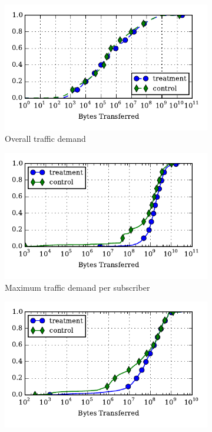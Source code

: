 \begin{figure}[ht]
\begin{minipage}{1\linewidth}
\centering
%
\begin{subfigure}[b]{0.33\linewidth}
\includegraphics[width=\linewidth]{figures/cdf-all-bytes.pdf}
               \caption{Overall traffic demand\label{fig:CDF-data-rate}}
\end{subfigure}
%
\begin{subfigure}[b]{0.33\linewidth}
\includegraphics[width=\linewidth]{figures/cdf-per-device-max.pdf}
               \caption{Maximum traffic demand 
per subscriber\label{fig:CDF-data-rate-max}}
\end{subfigure}
%
\begin{subfigure}[b]{0.33\linewidth}
\includegraphics[width=\linewidth]{figures/cdf-per-device-perc95.pdf}

\end{subfigure}
\end{minipage}
\end{figure}
